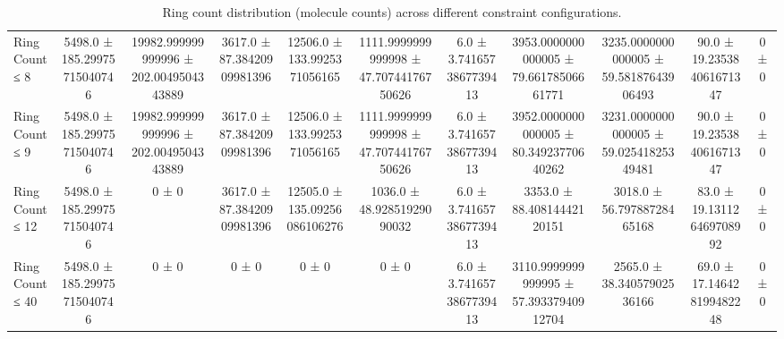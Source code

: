 \begin{table}[H]
\begin{tabular}{l c c c c c c c c c c}
        Ring Count ≤ 8 & 5498.0 ± 185.29975715040746 & 19982.999999999996 ± 202.0049504343889 & 3617.0 ± 87.38420909981396 & 12506.0 ± 133.9925371056165 & 1111.9999999999998 ± 47.70744176750626 & 6.0 ± 3.7416573867739413 & 3953.0000000000005 ± 79.66178506661771 & 3235.0000000000005 ± 59.58187643906493 & 90.0 ± 19.235384061671347 & 0 ± 0 \\
        Ring Count ≤ 9 & 5498.0 ± 185.29975715040746 & 19982.999999999996 ± 202.0049504343889 & 3617.0 ± 87.38420909981396 & 12506.0 ± 133.9925371056165 & 1111.9999999999998 ± 47.70744176750626 & 6.0 ± 3.7416573867739413 & 3952.0000000000005 ± 80.34923770640262 & 3231.0000000000005 ± 59.02541825349481 & 90.0 ± 19.235384061671347 & 0 ± 0 \\
        Ring Count ≤ 12 & 5498.0 ± 185.29975715040746 & 0 ± 0 & 3617.0 ± 87.38420909981396 & 12505.0 ± 135.09256086106276 & 1036.0 ± 48.92851929090032 & 6.0 ± 3.7416573867739413 & 3353.0 ± 88.40814442120151 & 3018.0 ± 56.79788728465168 & 83.0 ± 19.131126469708992 & 0 ± 0 \\
        Ring Count ≤ 40 & 5498.0 ± 185.29975715040746 & 0 ± 0 & 0 ± 0 & 0 ± 0 & 0 ± 0 & 6.0 ± 3.7416573867739413 & 3110.9999999999995 ± 57.39337940912704 & 2565.0 ± 38.34057902536166 & 69.0 ± 17.146428199482248 & 0 ± 0 \\
        \bottomrule
    \end{tabular}
    \caption{Ring count distribution (molecule counts) across different constraint configurations.}
\end{table}

